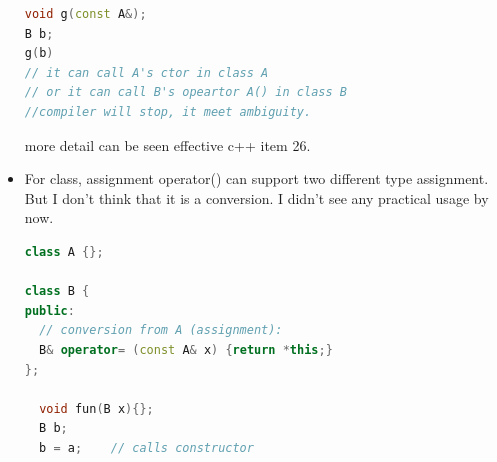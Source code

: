 \documentclass[a4paper,12pt,twoside]{book}
\begin{document}
\begin{itemize}
\begin{lstlisting}[frame=single, language=c++]
void g(const A&);
B b;
g(b)
// it can call A's ctor in class A
// or it can call B's opeartor A() in class B
//compiler will stop, it meet ambiguity.
\end{lstlisting}
more detail can be seen effective c++ item 26.

\item For class, assignment operator() can support two different type assignment. But I don't think that it is a conversion. I didn't see any practical usage by now. 
\begin{lstlisting}[frame=single, language=c++]
class A {};

class B {
public:
  // conversion from A (assignment):
  B& operator= (const A& x) {return *this;}
};

  void fun(B x){};
  B b;
  b = a;    // calls constructor
\end{lstlisting}

\end{itemize}
\end{document}
